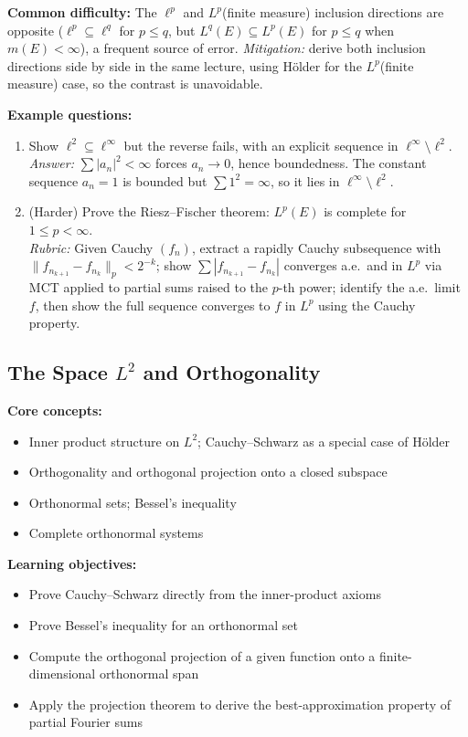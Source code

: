 \documentclass[11pt]{article}
\begin{document}
\textbf{Common difficulty:} The $\ell^p$ and $L^p$(finite measure) inclusion directions are opposite ($\ell^p\subseteq\ell^q$ for $p\le q$, but $L^q(E)\subseteq L^p(E)$ for $p\le q$ when $m(E)<\infty$), a frequent source of error. \textit{Mitigation:} derive both inclusion directions side by side in the same lecture, using H\"older for the $L^p$(finite measure) case, so the contrast is unavoidable.

\textbf{Example questions:}
\begin{enumerate}[nosep]
\item Show $\ell^2\subseteq\ell^\infty$ but the reverse fails, with an explicit sequence in $\ell^\infty\setminus\ell^2$. \\
\textit{Answer:} $\sum|a_n|^2<\infty$ forces $a_n\to0$, hence boundedness. The constant sequence $a_n=1$ is bounded but $\sum 1^2=\infty$, so it lies in $\ell^\infty\setminus\ell^2$.
\item (Harder) Prove the Riesz--Fischer theorem: $L^p(E)$ is complete for $1\le p<\infty$. \\
\textit{Rubric:} Given Cauchy $(f_n)$, extract a rapidly Cauchy subsequence with $\|f_{n_{k+1}}-f_{n_k}\|_p<2^{-k}$; show $\sum|f_{n_{k+1}}-f_{n_k}|$ converges a.e.\ and in $L^p$ via MCT applied to partial sums raised to the $p$-th power; identify the a.e.\ limit $f$, then show the full sequence converges to $f$ in $L^p$ using the Cauchy property.
\end{enumerate}

\subsection{The Space $L^2$ and Orthogonality}

\textbf{Core concepts:}
\begin{itemize}[nosep]
\item Inner product structure on $L^2$; Cauchy--Schwarz as a special case of H\"older
\item Orthogonality and orthogonal projection onto a closed subspace
\item Orthonormal sets; Bessel's inequality
\item Complete orthonormal systems
\end{itemize}

\textbf{Learning objectives:}
\begin{itemize}[nosep]
\item Prove Cauchy--Schwarz directly from the inner-product axioms
\item Prove Bessel's inequality for an orthonormal set
\item Compute the orthogonal projection of a given function onto a finite-dimensional orthonormal span
\item Apply the projection theorem to derive the best-approximation property of partial Fourier sums
\end{itemize}
\end{document}
